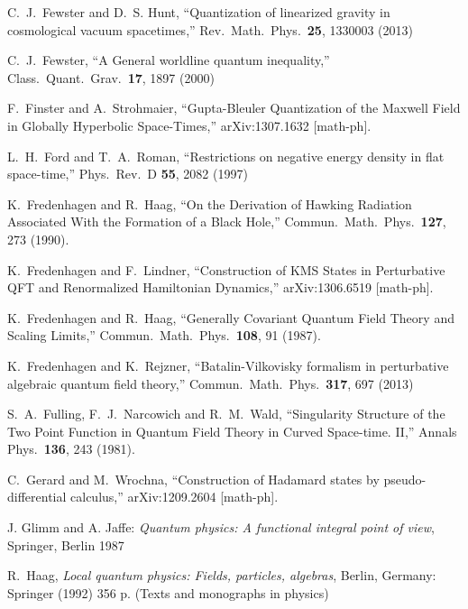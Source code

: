 \documentclass[12pt]{article}
\theoremstyle{plain}
\theoremstyle{definition}
\begin{document}
\begin{thebibliography}{99}
C.~J.~Fewster and D.~S. Hunt,
  ``Quantization of linearized gravity in cosmological vacuum spacetimes,''
  Rev.\ Math.\ Phys.\  {\bf 25}, 1330003 (2013)

C.~J.~Fewster,
  ``A General worldline quantum inequality,''
  Class.\ Quant.\ Grav.\  {\bf 17}, 1897 (2000)

F.~Finster and A.~Strohmaier,
  ``Gupta-Bleuler Quantization of the Maxwell Field in Globally Hyperbolic Space-Times,''
  arXiv:1307.1632 [math-ph].

L.~H.~Ford and T.~A.~Roman,
  ``Restrictions on negative energy density in flat space-time,''
  Phys.\ Rev.\ D {\bf 55}, 2082 (1997)

 K.~Fredenhagen and R.~Haag,
  ``On the Derivation of Hawking Radiation Associated With the Formation of a Black Hole,''
  Commun.\ Math.\ Phys.\  {\bf 127}, 273 (1990).

K.~Fredenhagen and F.~Lindner,
``Construction of KMS States in Perturbative QFT and Renormalized Hamiltonian Dynamics,''
arXiv:1306.6519 [math-ph].


  K.~Fredenhagen and R.~Haag,
  ``Generally Covariant Quantum Field Theory and Scaling Limits,''
  Commun.\ Math.\ Phys.\  {\bf 108}, 91 (1987).

  K.~Fredenhagen and K.~Rejzner,
  ``Batalin-Vilkovisky formalism in perturbative algebraic quantum field theory,''
  Commun.\ Math.\ Phys.\  {\bf 317}, 697 (2013)

 S.~A.~Fulling, F.~J.~Narcowich and R.~M.~Wald,
  ``Singularity Structure of the Two Point Function in Quantum Field Theory in Curved Space-time. {II},''
  Annals Phys.\  {\bf 136}, 243 (1981).

 C.~Gerard and M.~Wrochna,
  ``Construction of Hadamard states by pseudo-differential calculus,''
  arXiv:1209.2604 [math-ph].

J. Glimm and A. Jaffe: {\em Quantum physics: A functional integral point of view}, Springer, Berlin 1987

  R.~Haag,
  {\em Local quantum physics: Fields, particles, algebras},
  Berlin, Germany: Springer (1992) 356 p. (Texts and monographs in physics)



\end{thebibliography}
\end{document}
